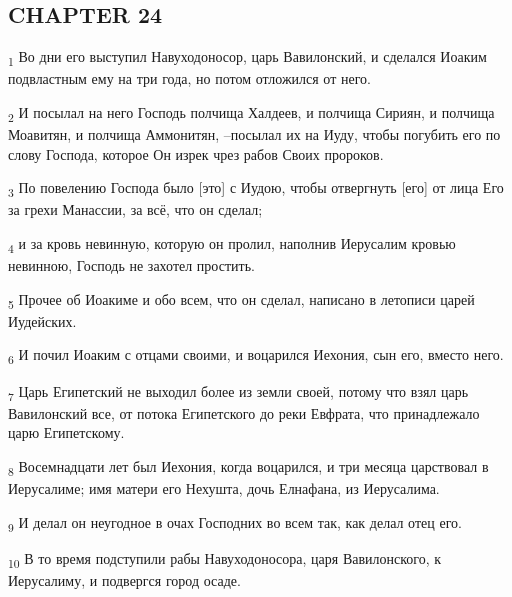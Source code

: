 \subsection{CHAPTER 24}
\begin{tcolorbox}
\textsubscript{1} Во дни его выступил Навуходоносор, царь Вавилонский, и сделался Иоаким подвластным ему на три года, но потом отложился от него.
\end{tcolorbox}
\begin{tcolorbox}
\textsubscript{2} И посылал на него Господь полчища Халдеев, и полчища Сириян, и полчища Моавитян, и полчища Аммонитян, --посылал их на Иуду, чтобы погубить его по слову Господа, которое Он изрек чрез рабов Своих пророков.
\end{tcolorbox}
\begin{tcolorbox}
\textsubscript{3} По повелению Господа было [это] с Иудою, чтобы отвергнуть [его] от лица Его за грехи Манассии, за всё, что он сделал;
\end{tcolorbox}
\begin{tcolorbox}
\textsubscript{4} и за кровь невинную, которую он пролил, наполнив Иерусалим кровью невинною, Господь не захотел простить.
\end{tcolorbox}
\begin{tcolorbox}
\textsubscript{5} Прочее об Иоакиме и обо всем, что он сделал, написано в летописи царей Иудейских.
\end{tcolorbox}
\begin{tcolorbox}
\textsubscript{6} И почил Иоаким с отцами своими, и воцарился Иехония, сын его, вместо него.
\end{tcolorbox}
\begin{tcolorbox}
\textsubscript{7} Царь Египетский не выходил более из земли своей, потому что взял царь Вавилонский все, от потока Египетского до реки Евфрата, что принадлежало царю Египетскому.
\end{tcolorbox}
\begin{tcolorbox}
\textsubscript{8} Восемнадцати лет был Иехония, когда воцарился, и три месяца царствовал в Иерусалиме; имя матери его Нехушта, дочь Елнафана, из Иерусалима.
\end{tcolorbox}
\begin{tcolorbox}
\textsubscript{9} И делал он неугодное в очах Господних во всем так, как делал отец его.
\end{tcolorbox}
\begin{tcolorbox}
\textsubscript{10} В то время подступили рабы Навуходоносора, царя Вавилонского, к Иерусалиму, и подвергся город осаде.
\end{tcolorbox}
